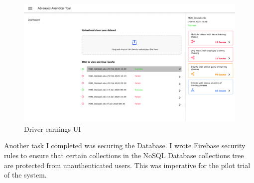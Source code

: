 \begin{figure}[h!]
	\begin{center}
		\includegraphics[width=450px]{assets/images/aat-dashboard.png}
		\caption{Driver earnings UI}
		\label{fig:aat-dashboard}
	\end{center}
\end{figure}

\noindent
Another task I completed was securing the Database. I wrote Firebase security rules to ensure that certain collections in the NoSQL Database collections tree are protected from unauthenticated users. This was imperative for the pilot trial of the system.
